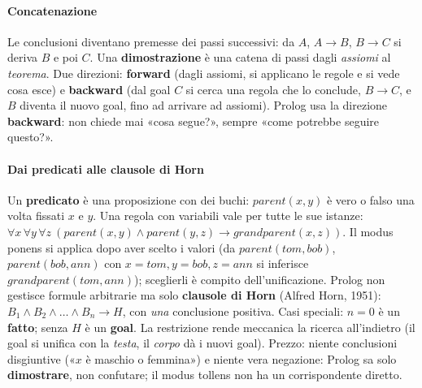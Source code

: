 \documentclass[a4paper,12pt]{article}
\begin{document}
\paragraph{Concatenazione} Le conclusioni diventano premesse dei passi successivi: da $A$,
$A \to B$, $B \to C$ si deriva $B$ e poi $C$. Una \textbf{dimostrazione} è una catena di passi
dagli \emph{assiomi} al \emph{teorema}. Due direzioni: \textbf{forward} (dagli assiomi, si
applicano le regole e si vede cosa esce) e \textbf{backward} (dal goal $C$ si cerca una regola
che lo conclude, $B \to C$, e $B$ diventa il nuovo goal, fino ad arrivare ad assiomi). Prolog
usa la direzione \textbf{backward}: non chiede mai «cosa segue?», sempre «come potrebbe
seguire questo?».

\paragraph{Dai predicati alle clausole di Horn} Un \textbf{predicato} è una proposizione con
dei buchi: $parent(x, y)$ è vero o falso una volta fissati $x$ e $y$. Una regola con variabili
vale per tutte le sue istanze:
$\forall x\,\forall y\,\forall z\ (parent(x,y) \land parent(y,z) \to grandparent(x,z))$. Il modus
ponens si applica dopo aver scelto i valori (da $parent(tom,bob)$, $parent(bob,ann)$ con
$x=tom, y=bob, z=ann$ si inferisce $grandparent(tom,ann)$); sceglierli è compito
dell'unificazione. Prolog non gestisce formule arbitrarie ma solo \textbf{clausole di Horn}
(Alfred Horn, 1951): $B_1 \land B_2 \land \dots \land B_n \to H$, con \emph{una} conclusione
positiva. Casi speciali: $n = 0$ è un \textbf{fatto}; senza $H$ è un \textbf{goal}. La
restrizione rende meccanica la ricerca all'indietro (il goal si unifica con la \emph{testa}, il
\emph{corpo} dà i nuovi goal). Prezzo: niente conclusioni disgiuntive («$x$ è maschio o
femmina») e niente vera negazione: Prolog sa solo \textbf{dimostrare}, non confutare; il modus
tollens non ha un corrispondente diretto.
\end{document}
